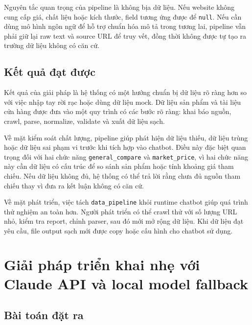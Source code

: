 \documentclass[../DoAn.tex]{subfiles}
\begin{document}
Nguyên tắc quan trọng của pipeline là không bịa dữ liệu. Nếu website không cung cấp giá, chất liệu hoặc kích thước, field tương ứng được để \texttt{null}. Nếu cần dùng mô hình ngôn ngữ để hỗ trợ chuẩn hóa mô tả trong tương lai, pipeline vẫn phải giữ lại raw text và source URL để truy vết, đồng thời không được tự tạo ra trường dữ liệu không có căn cứ.

\subsection{Kết quả đạt được}
\label{subsection:5.4.3}

Kết quả của giải pháp là hệ thống có một hướng chuẩn bị dữ liệu rõ ràng hơn so với việc nhập tay rời rạc hoặc dùng dữ liệu mock. Dữ liệu sản phẩm và tài liệu cửa hàng được đưa vào một quy trình có các bước rõ ràng: khai báo nguồn, crawl, parse, normalize, validate và xuất dữ liệu sạch.

Về mặt kiểm soát chất lượng, pipeline giúp phát hiện dữ liệu thiếu, dữ liệu trùng hoặc dữ liệu sai phạm vi trước khi tích hợp vào chatbot. Điều này đặc biệt quan trọng đối với hai chức năng \texttt{general\_compare} và \texttt{market\_price}, vì hai chức năng này cần dữ liệu có cấu trúc để so sánh sản phẩm hoặc tính khoảng giá tham chiếu. Nếu dữ liệu không đủ, hệ thống có thể trả lời rằng chưa đủ nguồn tham chiếu thay vì đưa ra kết luận không có căn cứ.

Về mặt phát triển, việc tách \texttt{data\_pipeline} khỏi runtime chatbot giúp quá trình thử nghiệm an toàn hơn. Người phát triển có thể crawl thử với số lượng URL nhỏ, kiểm tra report, chỉnh parser, sau đó mới mở rộng dữ liệu. Khi dữ liệu đạt yêu cầu, file output sạch mới được copy hoặc cấu hình cho chatbot sử dụng.


\section{Giải pháp triển khai nhẹ với Claude API và local model fallback}
\label{section:5.5}

\subsection{Bài toán đặt ra}
\label{subsection:5.5.1}
\end{document}
